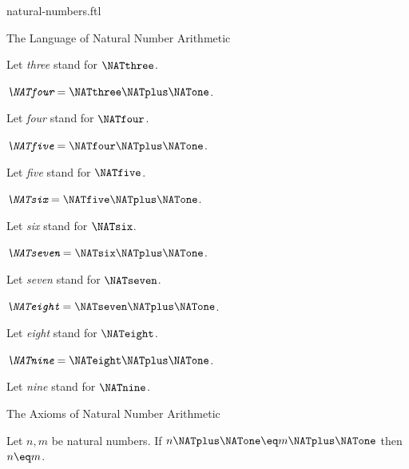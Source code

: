 \documentclass{stex}
\begin{document}
\begin{smodule}{natural-numbers.ftl}
\begin{sfragment}{The Language of Natural Number Arithmetic}
\begin{definition}[forthel,id=ARITHMETIC_01_3836725109456896]
    Let \emph{three} stand for $\NATthree$.
  \end{definition}

  \begin{definition}[forthel,id=ARITHMETIC_01_1709884968009728]
    $\emph{\NATfour} = \NATthree \NATplus \NATone$.

    Let \emph{four} stand for $\NATfour$.
  \end{definition}

  \begin{definition}[forthel,id=ARITHMETIC_01_6734726333202432]
    $\emph{\NATfive} = \NATfour \NATplus \NATone$.

    Let \emph{five} stand for $\NATfive$.
  \end{definition}

  \begin{definition}[forthel,id=ARITHMETIC_01_949139189792768]
    $\emph{\NATsix} = \NATfive \NATplus \NATone$.

    Let \emph{six} stand for $\NATsix$.
  \end{definition}

  \begin{definition}[forthel,id=ARITHMETIC_01_7245471749767168]
    $\emph{\NATseven} = \NATsix \NATplus \NATone$.

    Let \emph{seven} stand for $\NATseven$.
  \end{definition}

  \begin{definition}[forthel,id=ARITHMETIC_01_5658172888973312]
    $\emph{\NATeight} = \NATseven \NATplus \NATone$.

    Let \emph{eight} stand for $\NATeight$.
  \end{definition}

  \begin{definition}[forthel,id=ARITHMETIC_01_7371844250238976]
    $\emph{\NATnine} = \NATeight \NATplus \NATone$.

    Let \emph{nine} stand for $\NATnine$.
  \end{definition}
\end{sfragment}

\begin{sfragment}{The Axioms of Natural Number Arithmetic}
  \begin{axiom}[forthel,id=ARITHMETIC_01_3604163883696128]
    Let $n, m$ be natural numbers.
    If $n \NATplus \NATone \eq m \NATplus \NATone$ then $n \eq m$.
  \end{axiom}


\end{sfragment}
\end{smodule}
\end{document}
